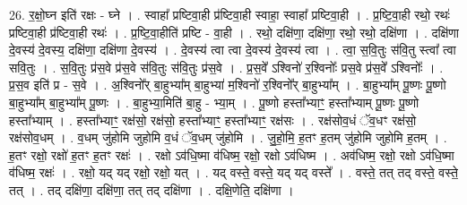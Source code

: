 \documentclass[17pt]{extarticle}
\begin{document}
26. र॒क्षो॒घ्न इति॑ रक्षः - घ्ने । . स्वाहा᳚ प्रष्टिवा॒ही प्र॑ष्टिवा॒ही स्वाहा॒ स्वाहा᳚ प्रष्टिवा॒ही । . प्र॒ष्टि॒वा॒ही रथो॒ रथः॑ प्रष्टिवा॒ही प्र॑ष्टिवा॒ही रथः॑ । . प्र॒ष्टि॒वा॒हीति॑ प्रष्टि - वा॒ही । . रथो॒ दक्षि॑णा॒ दक्षि॑णा॒ रथो॒ रथो॒ दक्षि॑णा । . दक्षि॑णा दे॒वस्य॑ दे॒वस्य॒ दक्षि॑णा॒ दक्षि॑णा दे॒वस्य॑ । . दे॒वस्य॑ त्वा त्वा दे॒वस्य॑ दे॒वस्य॑ त्वा । . त्वा॒ स॒वि॒तुः स॑वि॒तु स्त्वा᳚ त्वा सवि॒तुः । . स॒वि॒तुः प्र॑स॒वे प्र॑स॒वे स॑वि॒तुः स॑वि॒तुः प्र॑स॒वे । . प्र॒स॒वे᳚ ऽश्विनो॑ र॒श्विनोः᳚ प्रस॒वे प्र॑स॒वे᳚ ऽश्विनोः᳚ । . प्र॒स॒व इति॑ प्र - स॒वे । . अ॒श्विनो᳚र् बा॒हुभ्या᳚म् बा॒हुभ्या॑ म॒श्विनो॑ र॒श्विनो᳚र् बा॒हुभ्या᳚म् । . बा॒हुभ्या᳚म् पू॒ष्णः पू॒ष्णो बा॒हुभ्या᳚म् बा॒हुभ्या᳚म् पू॒ष्णः । . बा॒हुभ्या॒मिति॑ बा॒हु - भ्या॒म् । . पू॒ष्णो हस्ता᳚भ्याꣳ॒॒ हस्ता᳚भ्याम् पू॒ष्णः पू॒ष्णो हस्ता᳚भ्याम् । . हस्ता᳚भ्याꣳ॒॒ रक्ष॑सो॒ रक्ष॑सो॒ हस्ता᳚भ्याꣳ॒॒ हस्ता᳚भ्याꣳ॒॒ रक्ष॑सः । . रक्ष॑सोव॒धं ॅव॒धꣳ रक्ष॑सो॒ रक्ष॑सोव॒धम् । . व॒धम् जु॑होमि जुहोमि व॒धं ॅव॒धम् जु॑होमि । . जु॒हो॒मि॒ ह॒तꣳ ह॒तम् जु॑होमि जुहोमि ह॒तम् । . ह॒तꣳ रक्षो॒ रक्षो॑ ह॒तꣳ ह॒तꣳ रक्षः॑ । . रक्षो ऽव॑धि॒ष्मा व॑धिष्म॒ रक्षो॒ रक्षो ऽव॑धिष्म । . अव॑धिष्म॒ रक्षो॒ रक्षो ऽव॑धि॒ष्मा व॑धिष्म॒ रक्षः॑ । . रक्षो॒ यद् यद् रक्षो॒ रक्षो॒ यत् । . यद् वस्ते॒ वस्ते॒ यद् यद् वस्ते᳚ । . वस्ते॒ तत् तद् वस्ते॒ वस्ते॒ तत् । . तद् दक्षि॑णा॒ दक्षि॑णा॒ तत् तद् दक्षि॑णा । . दक्षि॒णेति॒ दक्षि॑णा । \newline
\end{document}
